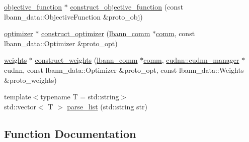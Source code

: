 \begin{DoxyCompactItemize}
\hyperlink{classlbann_1_1objective__function}{objective\+\_\+function} $\ast$ \hyperlink{namespacelbann_1_1proto_a2b55ede441a057291e047cf4e7352481}{construct\+\_\+objective\+\_\+function} (const lbann\+\_\+data\+::\+Objective\+Function \&proto\+\_\+obj)
\item 
\hyperlink{classlbann_1_1optimizer}{optimizer} $\ast$ \hyperlink{namespacelbann_1_1proto_af85d2b9f1e986bbab4feccfaa19c9960}{construct\+\_\+optimizer} (\hyperlink{classlbann_1_1lbann__comm}{lbann\+\_\+comm} $\ast$\hyperlink{file__io_8cpp_ab048c6f9fcbcfaa57ce68b00263dbebe}{comm}, const lbann\+\_\+data\+::\+Optimizer \&proto\+\_\+opt)
\item 
\hyperlink{classlbann_1_1weights}{weights} $\ast$ \hyperlink{namespacelbann_1_1proto_a1e95259d3e7fd20a9c361850940a398a}{construct\+\_\+weights} (\hyperlink{classlbann_1_1lbann__comm}{lbann\+\_\+comm} $\ast$\hyperlink{file__io_8cpp_ab048c6f9fcbcfaa57ce68b00263dbebe}{comm}, \hyperlink{classlbann_1_1cudnn_1_1cudnn__manager}{cudnn\+::cudnn\+\_\+manager} $\ast$cudnn, const lbann\+\_\+data\+::\+Optimizer \&proto\+\_\+opt, const lbann\+\_\+data\+::\+Weights \&proto\+\_\+weights)
\item 
{\footnotesize template$<$typename T  = std\+::string$>$ }\\std\+::vector$<$ T $>$ \hyperlink{namespacelbann_1_1proto_a6c6742da9015768123b7cddd74d17399}{parse\+\_\+list} (std\+::string str)
\end{DoxyCompactItemize}


\subsection{Function Documentation}
\mbox{\label{namespacelbann_1_1proto_a00597c8b7450c389847980cf6934a619}} 
